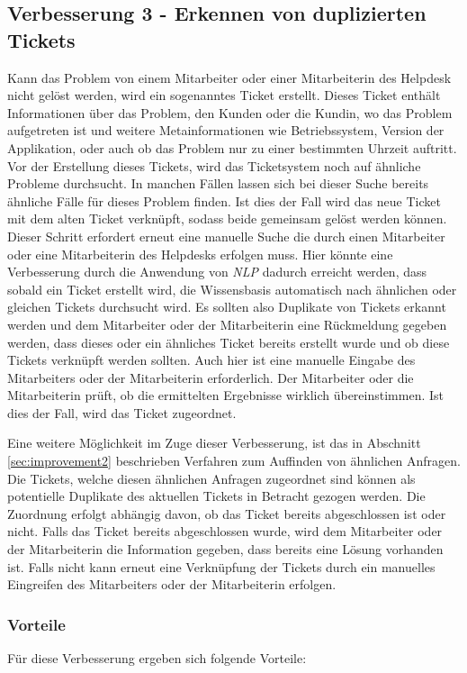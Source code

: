 \subsection{Verbesserung 3 - Erkennen von duplizierten Tickets}
Kann das Problem von einem Mitarbeiter oder einer Mitarbeiterin des Helpdesk nicht gelöst werden, wird ein sogenanntes Ticket erstellt. Dieses Ticket enthält Informationen über das Problem, den Kunden oder die Kundin, wo das Problem aufgetreten ist und weitere Metainformationen wie Betriebssystem, Version der Applikation, oder auch ob das Problem nur zu einer bestimmten Uhrzeit auftritt. Vor der Erstellung dieses Tickets, wird das Ticketsystem noch auf ähnliche Probleme durchsucht. In manchen Fällen lassen sich bei dieser Suche bereits ähnliche Fälle für dieses Problem finden. Ist dies der Fall wird das neue Ticket mit dem alten Ticket verknüpft, sodass beide gemeinsam gelöst werden können. Dieser Schritt erfordert erneut eine manuelle Suche die durch einen Mitarbeiter oder eine Mitarbeiterin des Helpdesks erfolgen muss. Hier könnte eine Verbesserung durch die Anwendung von \textit{NLP} dadurch erreicht werden, dass sobald ein Ticket erstellt wird, die Wissensbasis automatisch nach ähnlichen oder gleichen Tickets durchsucht wird. Es sollten also Duplikate von Tickets erkannt werden und dem Mitarbeiter oder der Mitarbeiterin eine Rückmeldung gegeben werden, dass dieses oder ein ähnliches Ticket bereits erstellt wurde und ob diese Tickets verknüpft werden sollten. Auch hier ist eine manuelle Eingabe des Mitarbeiters oder der Mitarbeiterin erforderlich. Der Mitarbeiter oder die Mitarbeiterin prüft, ob die ermittelten Ergebnisse wirklich übereinstimmen. Ist dies der Fall, wird das Ticket zugeordnet.

Eine weitere Möglichkeit im Zuge dieser Verbesserung, ist das in Abschnitt \ref{sec:improvement2} beschrieben Verfahren zum Auffinden von ähnlichen Anfragen. Die Tickets, welche diesen ähnlichen Anfragen zugeordnet sind können als potentielle Duplikate des aktuellen Tickets in Betracht gezogen werden. Die Zuordnung erfolgt abhängig davon, ob das Ticket bereits abgeschlossen ist oder nicht. Falls das Ticket bereits abgeschlossen wurde, wird dem Mitarbeiter oder der Mitarbeiterin die Information gegeben, dass bereits eine Lösung vorhanden ist. Falls nicht kann erneut eine Verknüpfung der Tickets durch ein manuelles Eingreifen des Mitarbeiters oder der Mitarbeiterin erfolgen.

\subsubsection{Vorteile}
Für diese Verbesserung ergeben sich folgende Vorteile:


